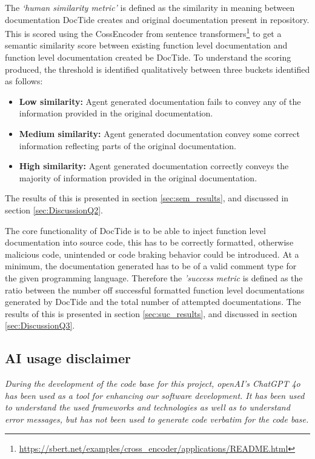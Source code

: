 The \textit{`human similarity metric'} is defined as the similarity in meaning between documentation DocTide creates and original documentation present in repository. This is scored using the CossEncoder from sentence transformers\footnote{\url{https://sbert.net/examples/cross_encoder/applications/README.html}} to get a semantic similarity score between existing function level documentation and function level documentation created be DocTide. To understand the scoring produced, the threshold is identified qualitatively between three buckets identified as follows:
\begin{itemize}
    \item \textbf{Low similarity:} Agent generated documentation fails to convey any of the information provided in the original documentation.
    \item \textbf{Medium similarity:} Agent generated documentation convey some correct information reflecting parts of the original documentation.
    \item \textbf{High similarity:} Agent generated documentation correctly conveys the majority of information provided in the original documentation.
\end{itemize}
The results of this is presented in section \ref{sec:sem_results}, and discussed in section \ref{sec:DiscussionQ2}.

The core functionality of DocTide is to be able to inject function level documentation into source code, this has to be correctly formatted, otherwise malicious code, unintended or code braking behavior could be introduced. At a minimum, the documentation generated has to be of a valid comment type for the given programming language. Therefore the \textit{'success metric} is defined as the ratio between the number off successful formatted function level documentations generated by DocTide and the total number of attempted documentations. The results of this is presented in section \ref{sec:suc_results}, and discussed in section \ref{sec:DiscussionQ3}.

\subsection{AI usage disclaimer}
\textit{During the development of the code base for this project, openAI's ChatGPT 4o has been used as a tool for enhancing our software development. It has been used to understand the used frameworks and technologies as well as to understand error messages, but has not been used to generate code verbatim for the code base.
}